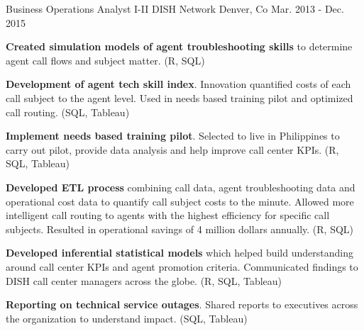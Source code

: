 \begin{cventries}
  \cventry
    {Business Operations Analyst I-II} %
    {DISH Network} %
    {Denver, Co} %
    {Mar. 2013 - Dec. 2015} %
    {
      \begin{cvitems} %
        \item {\textbf{Created simulation models of agent troubleshooting skills} to determine agent call flows and subject matter. (R, SQL)}
        \item {\textbf{Development of agent tech skill index}. Innovation quantified costs of each call subject to the agent level. Used in needs based training pilot and optimized call routing. (SQL, Tableau)}
        \item {\textbf{Implement needs based training pilot}. Selected to live in Philippines to carry out pilot, provide data analysis and help improve call center KPIs. (R, SQL, Tableau)}
        \item {\textbf{Developed ETL process} combining call data, agent troubleshooting data and operational cost data to quantify call subject costs to the minute. Allowed more intelligent call routing to agents with the highest efficiency for specific call subjects. Resulted in operational savings of 4 million dollars annually. (R, SQL)}
        \item {\textbf{Developed inferential statistical models} which helped build understanding around call center KPIs and agent promotion criteria. Communicated findings to DISH call center managers across the globe. (R, SQL, Tableau)}
        \item {\textbf{Reporting on technical service outages}. Shared reports to executives across the organization to understand impact. (SQL, Tableau)}
      \end{cvitems}
    }

\end{cventries}
